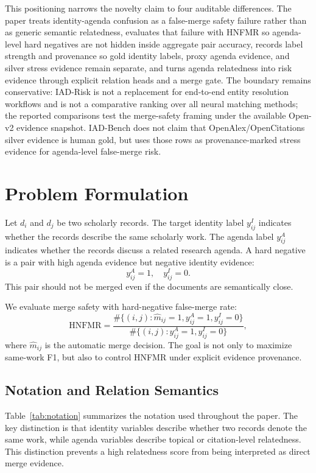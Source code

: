 \documentclass[11pt]{article}
\begin{document}
This positioning narrows the novelty claim to four auditable differences. The paper treats identity-agenda confusion as a false-merge safety failure rather than as generic semantic relatedness, evaluates that failure with HNFMR so agenda-level hard negatives are not hidden inside aggregate pair accuracy, records label strength and provenance so gold identity labels, proxy agenda evidence, and silver stress evidence remain separate, and turns agenda relatedness into risk evidence through explicit relation heads and a merge gate. The boundary remains conservative: IAD-Risk is not a replacement for end-to-end entity resolution workflows and is not a comparative ranking over all neural matching methods; the reported comparisons test the merge-safety framing under the available Open-v2 evidence snapshot. IAD-Bench does not claim that OpenAlex/OpenCitations silver evidence is human gold, but uses those rows as provenance-marked stress evidence for agenda-level false-merge risk.

\section{Problem Formulation}

Let $d_i$ and $d_j$ be two scholarly records. The target identity label $y^{I}_{ij}$ indicates whether the records describe the same scholarly work. The agenda label $y^{A}_{ij}$ indicates whether the records discuss a related research agenda. A hard negative is a pair with high agenda evidence but negative identity evidence:
\[
y^{A}_{ij}=1,\quad y^{I}_{ij}=0.
\]
This pair should not be merged even if the documents are semantically close.

We evaluate merge safety with hard-negative false-merge rate:
\[
\mathrm{HNFMR} = \frac{\#\{(i,j): \hat{m}_{ij}=1, y^{A}_{ij}=1, y^{I}_{ij}=0\}}{\#\{(i,j): y^{A}_{ij}=1, y^{I}_{ij}=0\}},
\]
where $\hat{m}_{ij}$ is the automatic merge decision. The goal is not only to maximize same-work F1, but also to control HNFMR under explicit evidence provenance.

\subsection{Notation and Relation Semantics}

Table~\ref{tab:notation} summarizes the notation used throughout the paper. The key distinction is that identity variables describe whether two records denote the same work, while agenda variables describe topical or citation-level relatedness. This distinction prevents a high relatedness score from being interpreted as direct merge evidence.
\end{document}
